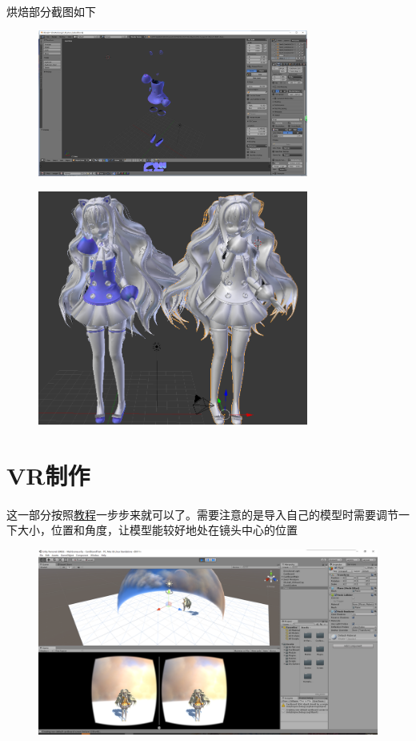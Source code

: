 \documentclass{article}
\begin{document}
\paragraph{}
烘焙部分截图如下
\begin{figure}[H]
  \centering
  \includegraphics[width=24em]{baking.png}\\
  \caption{}\label{1-5}
  \includegraphics[width=24em]{result.png}\\
  \caption{}\label{1-5}
\end{figure}
\newpage
\section{VR制作}
\paragraph{}
这一部分按照\href{http://www.sitepoint.com/building-a-google-cardboard-vr-app-in-unity/}{教程}一步步来就可以了。需要注意的是导入自己的模型时需要调节一下大小，位置和角度，让模型能较好地处在镜头中心的位置
\begin{figure}[H]
  \centering
  \includegraphics[width=36em]{unity.png}\\
  \caption{}\label{2-1}
\end{figure}
\end{document}
